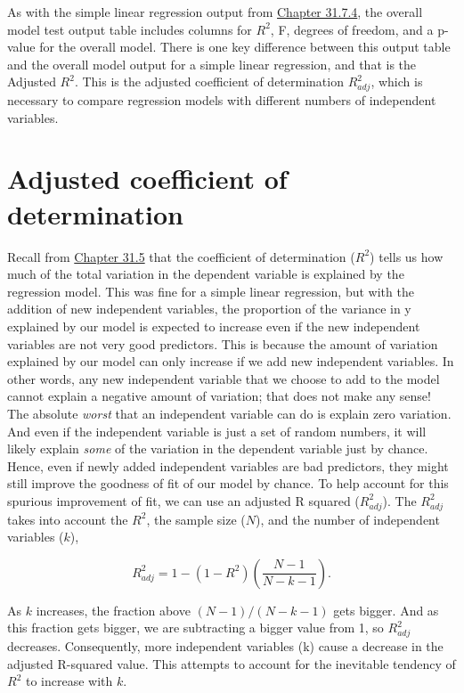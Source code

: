 \documentclass[
]{scrbook}
\begin{document}
As with the simple linear regression output from \protect\hyperlink{simple-regression-output}{Chapter 31.7.4}, the overall model test output table includes columns for \(R^{2}\), F, degrees of freedom, and a p-value for the overall model.
There is one key difference between this output table and the overall model output for a simple linear regression, and that is the Adjusted \(R^{2}\).
This is the adjusted coefficient of determination \(R^{2}_{adj}\), which is necessary to compare regression models with different numbers of independent variables.

\hypertarget{adjusted-coefficient-of-determination}{%
\section{Adjusted coefficient of determination}\label{adjusted-coefficient-of-determination}}

Recall from \protect\hyperlink{coefficient-of-determination}{Chapter 31.5} that the coefficient of determination (\(R^{2}\)) tells us how much of the total variation in the dependent variable is explained by the regression model.
This was fine for a simple linear regression, but with the addition of new independent variables, the proportion of the variance in y explained by our model is expected to increase even if the new independent variables are not very good predictors.
This is because the amount of variation explained by our model can only increase if we add new independent variables.
In other words, any new independent variable that we choose to add to the model cannot explain a negative amount of variation; that does not make any sense!
The absolute \emph{worst} that an independent variable can do is explain zero variation.
And even if the independent variable is just a set of random numbers, it will likely explain \emph{some} of the variation in the dependent variable just by chance.
Hence, even if newly added independent variables are bad predictors, they might still improve the goodness of fit of our model by chance.
To help account for this spurious improvement of fit, we can use an adjusted R squared (\(R^{2}_{adj}\)).
The \(R^{2}_{adj}\) takes into account the \(R^{2}\), the sample size (\(N\)), and the number of independent variables (\(k\)),

\[R^{2}_{adj} = 1 - \left(1 - R^{2}\right)\left(\frac{N - 1}{N - k - 1}\right).\]

As \(k\) increases, the fraction above \((N-1)/(N-k-1)\) gets bigger.
And as this fraction gets bigger, we are subtracting a bigger value from 1, so \(R^{2}_{adj}\) decreases.
Consequently, more independent variables (k) cause a decrease in the adjusted R-squared value.
This attempts to account for the inevitable tendency of \(R^{2}\) to increase with \(k\).
\end{document}
